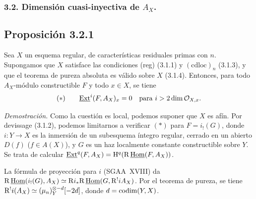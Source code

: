 \subsubsection*{3.2. Dimensión cuasi-inyectiva de $A_X$.}

\subsection*{Proposición 3.2.1}
Sea $X$ un esquema regular, de características residuales primas con $n$. Supongamos que $X$ satisface las condiciones (reg) (3.1.1) y $(\mathrm{cdloc})_n$ (3.1.3), y que el teorema de pureza absoluta es válido sobre $X$ (3.1.4). Entonces, para todo $A_X$-módulo constructible $F$ y todo $x \in X$, se tiene
\[
(*) \qquad \underline{\operatorname{Ext}}^i(F, A_X)_x = 0 \quad \text{para } i > 2\dim \mathcal{O}_{X,x}.
\]

\emph{Demostración.} Como la cuestión es local, podemos suponer que $X$ es afín. Por devissage (3.1.2), podemos limitarnos a verificar $(*)$ para $F = i_{!}(G)$, donde $i : Y \to X$ es la inmersión de un subesquema íntegro regular, cerrado en un abierto $D(f)$ ($f \in A(X)$), y $G$ es un haz localmente constante constructible sobre $Y$. Se trata de calcular $\underline{\operatorname{Ext}}^q(F, A_X) = \mathrm{H}^q(\mathrm{R}\,\underline{\operatorname{Hom}}(F, A_X))$.

La fórmula de proyección para $i$ (SGAA~XVIII) da $\mathrm{R}\,\underline{\operatorname{Hom}}(i_{!}(G), A_X) \simeq \mathrm{R} i_{*} \mathrm{R}\,\underline{\operatorname{Hom}}(G, \mathrm{R}^{!}iA_X)$. Por el teorema de pureza, se tiene $\mathrm{R}^{!}i(A_X) \simeq (\mu_n)^{\otimes -d}_Y[-2d]$, donde $d = \operatorname{codim}(Y,X)$.

